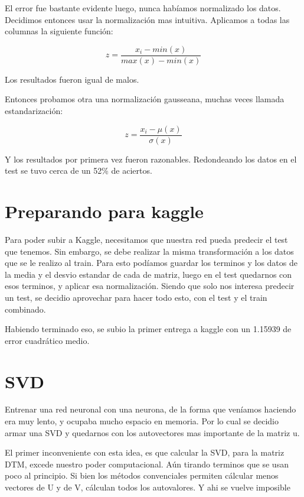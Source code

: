 El error fue bastante evidente luego, nunca habíamos normalizado los datos. Decidimos entonces usar la normalización mas intuitiva. Aplicamos a todas las columnas la siguiente función:

\begin{equation}
z = \frac{x_{i}-min(x)}{max(x)-min(x)}
\end{equation}

Los resultados fueron igual de malos.

Entonces probamos otra una normalización gausseana, muchas veces llamada estandarización:

\begin{equation}
z = \frac{x_{i}-\mu(x)}{\sigma(x)}
\end{equation}

Y los resultados por primera vez fueron razonables. Redondeando los datos en el test se tuvo cerca de un 52\% de aciertos.

\section{Preparando para kaggle}

Para poder subir a Kaggle, necesitamos que nuestra red pueda predecir el test que tenemos. Sin embargo, se debe realizar la misma transformación a los datos que se le realizo al train. Para esto podíamos guardar los terminos y los datos de la media y el desvio estandar de cada de matriz, luego en el test quedarnos con esos terminos, y aplicar esa normalización. Siendo que solo nos interesa predecir un test, se decidio aprovechar para hacer todo esto, con el test y el train combinado.

Habiendo terminado eso, se subio la primer entrega a kaggle con un 1.15939 de error cuadrático medio.

\section{SVD}

Entrenar una red neuronal con una neurona, de la forma que veníamos haciendo era muy lento, y ocupaba mucho espacio en memoria. Por lo cual se decidio armar una SVD y quedarnos con los autovectores mas importante de la matriz u.

El primer inconveniente con esta idea, es que calcular la SVD, para la matriz DTM, excede nuestro poder computacional. Aún tirando terminos que se usan poco al principio. Si bien los métodos convenciales permiten cálcular menos vectores de U y de V, cálculan todos los autovalores. Y ahi se vuelve imposible 

